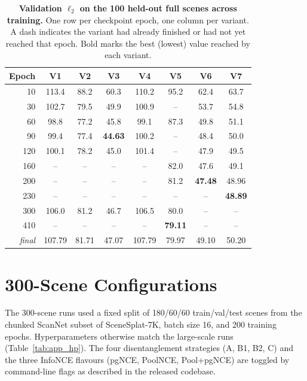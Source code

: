 \begin{table}[t]
  \centering
  \caption[Combined per-variant validation progression]{\textbf{Validation $\ell_2$ on the 100 held-out full scenes across training.} One row per checkpoint epoch, one column per variant. A dash indicates the variant had already finished or had not yet reached that epoch. Bold marks the best (lowest) value reached by each variant.}
  \label{tab:app_epochs}
  {\small
  \begin{tabular}{rccccccc}
    \toprule
    Epoch & V1 & V2 & V3 & V4 & V5 & V6 & V7 \\
    \midrule
    10    & 113.4 & 88.2 & 60.3 & 110.2 & 95.2 & 62.4 & 63.7 \\
    30    & 102.7 & 79.5 & 49.9 & 100.9 & --   & 53.7 & 54.8 \\
    60    & 98.8  & 77.2 & 45.8 & 99.1  & 87.3 & 49.8 & 51.1 \\
    90    & 99.4  & 77.4 & \textbf{44.63} & 100.2 & --   & 48.4 & 50.0 \\
    120   & 100.1 & 78.2 & 45.0 & 101.4 & --   & 47.9 & 49.5 \\
    160   & --    & --   & --   & --    & 82.0 & 47.6 & 49.1 \\
    200   & --    & --   & --   & --    & 81.2 & \textbf{47.48} & 48.96 \\
    230   & --    & --   & --   & --    & --   & --   & \textbf{48.89} \\
    300   & 106.0 & 81.2 & 46.7 & 106.5 & 80.0 & --   & -- \\
    410   & --    & --   & --   & --    & \textbf{79.11} & --   & -- \\
    \midrule
    \emph{final} & 107.79 & 81.71 & 47.07 & 107.79 & 79.97 & 49.10 & 50.20 \\
    \bottomrule
  \end{tabular}}
\end{table}

\section{300-Scene Configurations}
\label{app:300_configs}

The 300-scene runs used a fixed split of 180/60/60 train/val/test scenes from the chunked ScanNet subset of SceneSplat-7K, batch size 16, and 200 training epochs. Hyperparameters otherwise match the large-scale runs (Table~\ref{tab:app_hp}). The four disentanglement strategies (A, B1, B2, C) and the three InfoNCE flavours (pgNCE, PoolNCE, Pool+pgNCE) are toggled by command-line flags as described in the released codebase.

